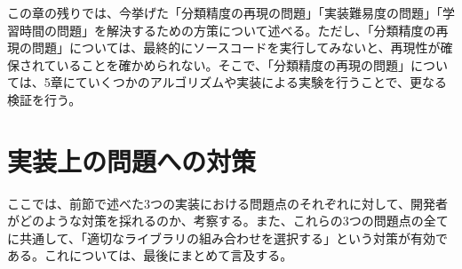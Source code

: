 この章の残りでは、今挙げた「分類精度の再現の問題」「実装難易度の問題」「学習時間の問題」を解決するための方策について述べる。ただし、「分類精度の再現の問題」については、最終的にソースコードを実行してみないと、再現性が確保されていることを確かめられない。そこで、「分類精度の再現の問題」については、5章にていくつかのアルゴリズムや実装による実験を行うことで、更なる検証を行う。

\section{実装上の問題への対策}
ここでは、前節で述べた3つの実装における問題点のそれぞれに対して、開発者がどのような対策を採れるのか、考察する。また、これらの3つの問題点の全てに共通して、「適切なライブラリの組み合わせを選択する」という対策が有効である。これについては、最後にまとめて言及する。
